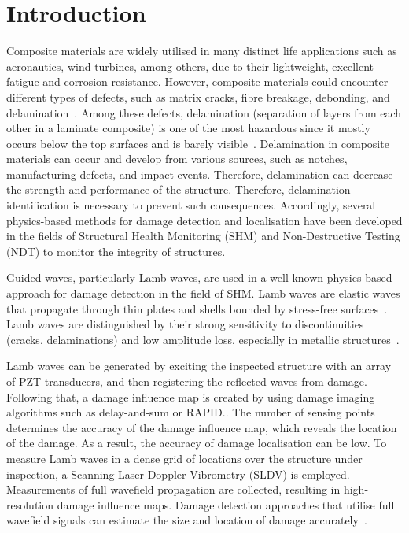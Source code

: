 \documentclass{IOS-Book-Article}
\begin{document}
\section{Introduction}
\begin{sloppypar}
	Composite materials are widely utilised in many distinct life applications such as aeronautics, wind turbines, among others, due to their lightweight, excellent fatigue and corrosion resistance.
	However, composite materials could encounter different types of defects, such as matrix cracks, fibre breakage, debonding, and delamination~\cite{smith2009composite, ip2004delamination}. 
	Among these defects, delamination (separation of layers from each other in a laminate composite) is one of the most hazardous since it mostly occurs below the top surfaces and is barely visible~\cite{Cai2012a}.
	Delamination in composite materials can occur and develop from various sources, such as notches,  manufacturing defects, and impact events. Therefore, delamination can decrease the strength and performance of the structure. 
	Therefore, delamination identification is necessary to prevent such consequences. 
	Accordingly, several physics-based methods for damage detection and localisation have been developed in the fields of Structural Health Monitoring (SHM) and Non-Destructive Testing (NDT) to monitor the integrity of structures.
	
	Guided waves, particularly Lamb waves, are used in a well-known physics-based approach for damage detection in the field of SHM.
	Lamb waves are elastic waves that propagate through thin plates and shells bounded by stress-free surfaces~\cite{mitra2016guided}.
	Lamb waves are distinguished by their strong sensitivity to discontinuities (cracks, delaminations) and low amplitude loss, especially in metallic structures~\cite{Keulen2014}.
	
	Lamb waves can be generated by exciting the inspected structure with an array of PZT transducers, and then registering the reflected waves from damage.
	Following that, a damage influence map is created by using damage imaging algorithms such as delay-and-sum or RAPID..
	The number of sensing points determines the accuracy of the damage influence map, which reveals the location of the damage.
	As a result, the accuracy of damage localisation can be low.
	To measure Lamb waves in a dense grid of locations over the structure under inspection, a Scanning Laser Doppler Vibrometry (SLDV) is employed.
	Measurements of full wavefield propagation are collected, resulting in high-resolution damage influence maps.
	Damage detection approaches that utilise full wavefield signals can estimate the size and location of damage accurately~\cite{Girolamo2018a, kudela2018impact}.
	

\end{sloppypar}
\end{document}
